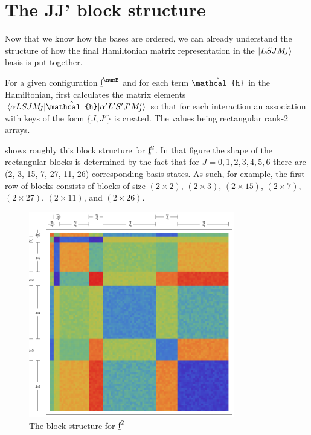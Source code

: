 \documentclass{article}
\begin{document}
\section{The JJ' block structure}

Now that we know how the bases are ordered, we can already understand the structure of how the final Hamiltonian matrix representation in the $|LSJM_{\!{J}}\rangle$ basis is put together.

For a given configuration $\forb^\numE$ and for each term $\op{\mathcal{h}}$ in the Hamiltonian, \qlanth first calculates the matrix elements $\braopket{\alpha L S J \Msub{J}}{\op{\mathcal{h}}}{\alpha' L' S' J' \Msub{J}'}$ so that for each interaction an association with keys of the form $\{J, J'\}$ is created. The values being rectangular rank-2 arrays.

 shows roughly this block structure for $\underbar{$\text{f}$}^2$. In that figure the shape of the rectangular blocks is determined by the fact that for $J=0,1,2,3,4,5,6$ there are (2, 3, 15, 7, 27, 11, 26) corresponding basis states. As such, for example, the first row of blocks consists of blocks of size $(2\times{2})$, $(2\times{3})$, $(2\times{15})$, $(2\times{7})$, $(2\times{27})$, $(2\times{11})$, and $(2\times{26})$.

\begin{figure}[h!]
\begin{center}
	\includegraphics[width=0.8\textwidth]{blockStruct.pdf}
\end{center}
\caption{The block structure for $\underbar{$\text{f}$}^2$}
\label{JJ blocks} 
\end{figure}
\end{document}
